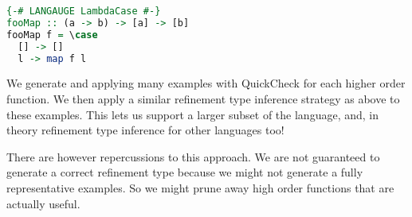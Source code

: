 \begin{lstlisting}[language=haskell]
{-# LANGAUGE LambdaCase #-}
fooMap :: (a -> b) -> [a] -> [b]
fooMap f = \case
  [] -> []
  l -> map f l
 \end{lstlisting}

We generate and applying many examples with QuickCheck for each higher order function.
We then apply a similar refinement type inference strategy as above to these examples.
This lets us support a larger subset of the language, and, in theory refinement type inference for other languages too!

There are however repercussions to this approach. We are not guaranteed to generate a correct refinement type because we might not generate a fully representative examples. So we might prune away high order functions that are actually useful. 

